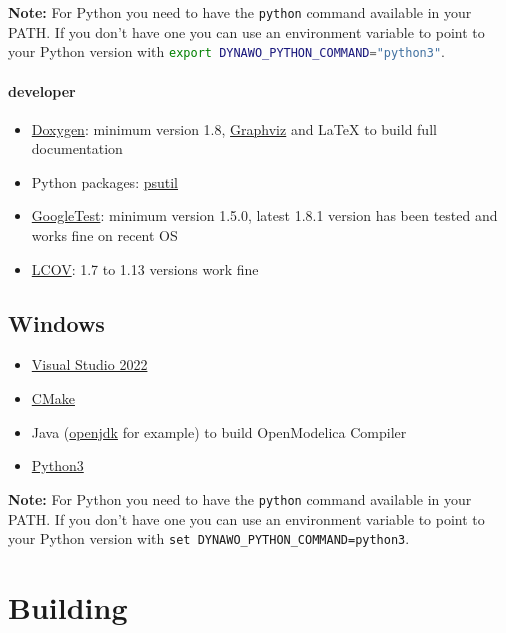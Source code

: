 \documentclass[a4paper, 12pt]{report}
\begin{document}
\textbf{Note:} For Python you need to have the \lstinline[language=bash]{python} command available in your PATH. If you don't have one you can use an environment variable to point to your Python version with \lstinline[language=bash]{export DYNAWO_PYTHON_COMMAND="python3"}.

\paragraph{\Dynawo developer}

\begin{itemize}
\item
  \href{http://www.doxygen.nl/}{Doxygen}: minimum version 1.8,
  \href{https://graphviz.readthedocs.io/en/stable/}{Graphviz} and LaTeX
  to build full documentation
\item
  Python packages:
  \href{https://psutil.readthedocs.io/en/latest/}{psutil}
\item
  \href{https://github.com/google/googletest}{GoogleTest}: minimum
  version 1.5.0, latest 1.8.1 version has been tested and works fine on
  recent OS
\item
  \href{http://ltp.sourceforge.net/coverage/lcov.php}{LCOV}: 1.7 to 1.13
  versions work fine
\end{itemize}

\subsection{Windows}

\begin{itemize}
\item
  \href{https://visualstudio.microsoft.com}{Visual Studio 2022}
\item
  \href{https://cmake.org}{CMake}
\item
  Java (\href{https://openjdk.java.net/}{openjdk} for example) to build OpenModelica Compiler
\item
  \href{https://www.python.org/ftp/python/3.8.2/python-3.8.2-amd64.exe}{Python3}
\end{itemize}

\textbf{Note:} For Python you need to have the \lstinline[language=bash]{python} command available in your PATH. If you don't have one you can use an environment variable to point to your Python version with \lstinline[language=command.com]{set DYNAWO_PYTHON_COMMAND=python3}.

\section[Building Dynawo]{Building \Dynawo}
\label{Dynawo_Installation_Documentation_Building_Dynawo}
\end{document}
